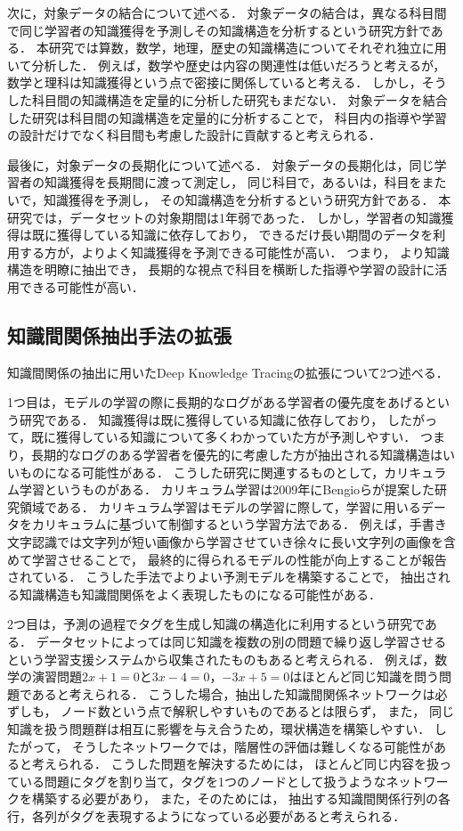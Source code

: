 次に，対象データの結合について述べる．
対象データの結合は，異なる科目間で同じ学習者の知識獲得を予測しその知識構造を分析するという研究方針である．
本研究では算数，数学，地理，歴史の知識構造についてそれぞれ独立に用いて分析した．
例えば，数学や歴史は内容の関連性は低いだろうと考えるが，
数学と理科は知識獲得という点で密接に関係していると考える．
しかし，そうした科目間の知識構造を定量的に分析した研究もまだない．
対象データを結合した研究は科目間の知識構造を定量的に分析することで，
科目内の指導や学習の設計だけでなく科目間も考慮した設計に貢献すると考えられる．


最後に，対象データの長期化について述べる．
対象データの長期化は，同じ学習者の知識獲得を長期間に渡って測定し，
同じ科目で，あるいは，科目をまたいで，知識獲得を予測し，
その知識構造を分析するという研究方針である．
本研究では，データセットの対象期間は1年弱であった．
しかし，学習者の知識獲得は既に獲得している知識に依存しており，
できるだけ長い期間のデータを利用する方が，よりよく知識獲得を予測できる可能性が高い．
つまり，
より知識構造を明瞭に抽出でき，
長期的な視点で科目を横断した指導や学習の設計に活用できる可能性が高い．



\subsection{知識間関係抽出手法の拡張}
知識間関係の抽出に用いたDeep Knowledge Tracingの拡張について2つ述べる．


1つ目は，モデルの学習の際に長期的なログがある学習者の優先度をあげるという研究である．
知識獲得は既に獲得している知識に依存しており，
したがって，既に獲得している知識について多くわかっていた方が予測しやすい．
つまり，長期的なログのある学習者を優先的に考慮した方が抽出される知識構造はいいものになる可能性がある．
こうした研究に関連するものとして，カリキュラム学習というものがある．
カリキュラム学習は2009年にBengioらが提案した研究領域\cite{bengio2009curriculum}である．
カリキュラム学習はモデルの学習に際して，学習に用いるデータをカリキュラムに基づいて制御するという学習方法である．
例えば，手書き文字認識では文字列が短い画像から学習させていき徐々に長い文字列の画像を含めて学習させることで，
最終的に得られるモデルの性能が向上することが報告されている\cite{louradour2014curriculum}．
こうした手法でよりよい予測モデルを構築することで，
抽出される知識構造も知識間関係をよく表現したものになる可能性がある．


2つ目は，予測の過程でタグを生成し知識の構造化に利用するという研究である．
データセットによっては同じ知識を複数の別の問題で繰り返し学習させるという学習支援システムから収集されたものもあると考えられる．
例えば，数学の演習問題$2x+1=0$と$3x-4=0$，$-3x+5=0$はほとんど同じ知識を問う問題であると考えられる．
こうした場合，抽出した知識間関係ネットワークは必ずしも，
ノード数という点で解釈しやすいものであるとは限らず，
また，
同じ知識を扱う問題群は相互に影響を与え合うため，環状構造を構築しやすい．
したがって，
そうしたネットワークでは，階層性の評価は難しくなる可能性があると考えられる．
こうした問題を解決するためには，
ほとんど同じ内容を扱っている問題にタグを割り当て，タグを1つのノードとして扱うようなネットワークを構築する必要があり，
また，そのためには，
抽出する知識間関係行列の各行，各列がタグを表現するようになっている必要があると考えられる．

